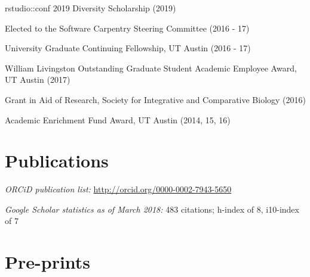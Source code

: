 \documentclass[margin,line]{CV}
\begin{document}
\begin{resume}
\begin{description}[leftmargin=0pt]  
\setlength{\itemsep}{1pt} 
\item[] rstudio::conf 2019 Diversity Scholarship (2019)
\item[] Elected to the Software Carpentry Steering Committee (2016 - 17)
\item[] University Graduate Continuing Fellowship, UT Austin (2016 - 17)
\item[] William Livingston Outstanding Graduate Student Academic Employee Award, UT Austin (2017)
\item[] Grant in Aid of Research,  Society for Integrative and Comparative Biology (2016)
\item[] Academic Enrichment Fund Award, UT Austin (2014, 15, 16)
\end{description}




\section{\mysidestyle Publications}
    
\begin{description}[leftmargin=0pt]  
\setlength{\itemsep}{2pt} 
\item[] {\em ORCiD publication list:} \url{http://orcid.org/0000-0002-7943-5650}
\item[] {\em Google Scholar statistics as of March 2018:} 483 citations; h-index of 8, i10-index of 7
\end{description}

\section{\mysidestyle Pre-prints}


\end{resume}
\end{document}
